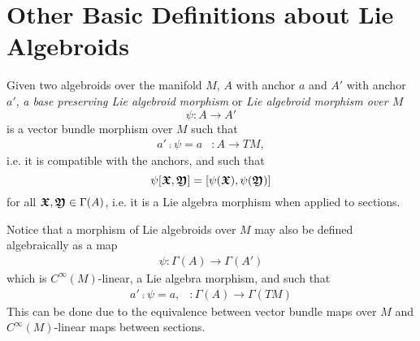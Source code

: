 \section{Other Basic Definitions about Lie Algebroids}
\begin{definition}  \label{defnMorph}
Given two algebroids over the manifold $M$, $A$ with anchor $a$ and $A'$ with anchor $a'$, \emph{a base preserving Lie algebroid morphism} or \emph{Lie algebroid morphism over $M$} 
\[\psi: A \to A'\]
is a vector bundle morphism over $M$ such that 
\begin{align}
    a' \comp \psi = a & : A \to TM,
\end{align}
i.e. it is compatible with the anchors, and such that 
\[\psi[\bm{\mathfrak{X}}, \bm{\mathfrak{Y}}] = [\psi(\bm{\mathfrak{X}}), \psi(\bm{\mathfrak{Y}})]\] 
for all $\bm{\mathfrak{X}}, \bm{\mathfrak{Y}} \in \Gamma(A)$, i.e. it is a Lie algebra morphism when applied to sections. 
\end{definition}

\begin{remark}
Notice that a morphism of Lie algebroids over $M$ may also be defined algebraically as a map
\begin{align*}
    \psi: \Gamma(A) \to \Gamma(A')
\end{align*}
which is $C^\infty(M)$-linear, a Lie algebra morphism, and such that
\begin{align*}
    a' \comp \psi = a, & :\Gamma(A) \to \Gamma(TM)
\end{align*}
This can be done due to the equivalence between vector bundle maps over $M$ and $C^\infty(M)$-linear maps between sections.
\end{remark}

